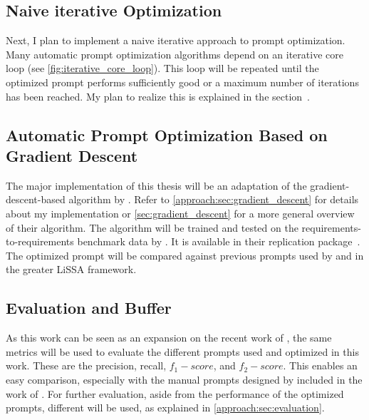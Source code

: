 \subsection{Naive iterative Optimization}
\label{phase_naive_iterative}

Next, I plan to implement a naive iterative approach to prompt optimization.
Many automatic prompt optimization algorithms \citeiterative depend on an iterative core loop (see \autoref{fig:iterative_core_loop}). This loop will be repeated until the optimized prompt performs sufficiently good or a maximum number of iterations has been reached.
My plan to realize this is explained in the section~.


\subsection{Automatic Prompt Optimization Based on Gradient Descent}
\label{phase_gradient_descent}

The major implementation of this thesis will be an adaptation of the gradient-descent-based \APO algorithm by .
Refer to \autoref{approach:sec:gradient_descent} for details about my implementation or \autoref{sec:gradient_descent} for a more general overview of their algorithm.
The \APO algorithm will be trained and tested on the requirements-to-requirements benchmark data by \citeauthor{hey2025RequirementsTraceability}.
It is available in their replication package~\cite{hey2025ReplicationPackage}.
The optimized prompt will be compared against previous prompts used by \citeauthor{fuchss2025LiSSAGeneric} and \citeauthor{hey2025RequirementsTraceability} in the greater LiSSA framework.


\subsection{Evaluation and Buffer}
\label{phase_evaluation}
As this work can be seen as an expansion on the recent work of , the same metrics will be used to evaluate the different prompts used and optimized in this work.
These are the precision, recall, $f_1-score$, and $f_2-score$.
This enables an easy comparison, especially with the manual prompts designed by  included in the work of \citeauthor{hey2025RequirementsTraceability}.
For further evaluation, aside from the performance of the optimized prompts, different \LLMs will be used, as explained in \autoref{approach:sec:evaluation}.




